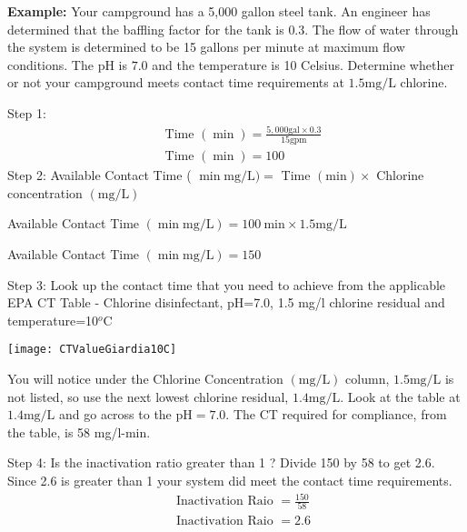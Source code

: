 \textbf{Example:}
Your campground has a 5,000 gallon steel tank. An engineer has determined that the baffling factor for the tank is $0.3$. The flow of water through the system is determined to be 15 gallons per minute at maximum flow conditions. The pH is $7.0$ and the temperature is 10 Celsius. Determine whether or not your campground meets contact time requirements at $1.5 \mathrm{mg} / \mathrm{L}$ chlorine.

Step 1:
$$
\begin{aligned}
&\text { Time }(\min )=\frac{5,000 \mathrm{gal} \times 0.3}{15 \mathrm{gpm}} \\
&\text { Time }(\min )=100
\end{aligned}
$$
Step 2: Available Contact Time ( $\min \mathrm{mg} / \mathrm{L})=$ Time $(\mathrm{min}) \times$ Chlorine concentration $(\mathrm{mg} / \mathrm{L})$

Available Contact Time $(\min \mathrm{mg} / \mathrm{L})=100 \mathrm{~min} \times 1.5 \mathrm{mg} / \mathrm{L}$

Available Contact Time $(\min \mathrm{mg} / \mathrm{L})=150$

Step 3: Look up the contact time that you need to achieve from the applicable EPA CT Table - Chlorine disinfectant, pH=7.0, 1.5 mg/l chlorine residual and temperature=10$^o$C


\begin{table}[htp]
\begin{center}
\texttt{[image: CTValueGiardia10C]}\\
\end{center}
\end{table}

You will notice under the Chlorine Concentration $(\mathrm{mg} / \mathrm{L})$ column, $1.5 \mathrm{mg} / \mathrm{L}$ is not listed, so use the next lowest chlorine residual, $1.4 \mathrm{mg} / \mathrm{L}$. Look at the table at $1.4 \mathrm{mg} / \mathrm{L}$ and go across to the $\mathrm{pH}=7.0$. The CT required for compliance, from the table, is 58 mg/l-min.

Step 4: Is the inactivation ratio greater than 1 ? Divide 150 by 58 to get 2.6. Since 2.6 is greater than 1 your system did meet the contact time requirements.
$$
\begin{aligned}
&\text { Inactivation Raio }=\frac{150}{58} \\
&\text { Inactivation Raio }=2.6
\end{aligned}
$$
